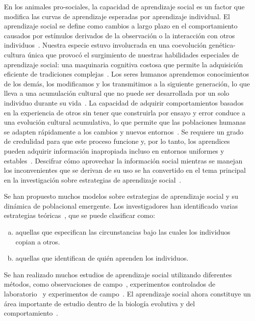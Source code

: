 \documentclass[a4paper,11pt]{book}
\theoremstyle{definition}
\begin{document}
En los animales pro-sociales, la capacidad de aprendizaje social es un factor que modifica las curvas de aprendizaje esperadas por aprendizaje individual.
%
El aprendizaje social se define como cambios a largo plazo en el comportamiento causados por est\'imulos derivados de la observaci\'on o la interacci\'on con otros individuos~\cite{hoppitt2013-socialLearningAnIntroductionBook,bandura1977-socialLearning}.
%
Nuestra especie estuvo involucrada en una coevoluci\'on gen\'etica-cultura \'unica que provoc\'o el surgimiento de nuestras habilidades especiales de aprendizaje social: una maquinaria cognitiva costosa que permite la adquisici\'on eficiente de tradiciones complejas~\cite{Richerson2010}.
%
Los seres humanos aprendemos conocimientos de los dem\'as, los modificamos y los transmitimos a la siguiente generaci\'on, lo que lleva a una acumulaci\'on cultural que no puede ser desarrollada por un solo individuo durante su vida~\cite{boyd1985-evolutionaryProcess}.
%
La capacidad de adquirir comportamientos basados en la experiencia de otros sin tener que construirla por ensayo y error conduce a una evoluci\'on cultural acumulativa, lo que permite que las poblaciones humanas se adapten r\'apidamente a los cambios y nuevos entornos~\cite{Boyd2011}.
%
Se requiere un grado de credulidad para que este proceso funcione y, por lo tanto, los aprendices pueden adquirir informaci\'on inapropiada incluso en entornos uniformes y estables~\cite{feldman1996-individualVsSocialLearningEvolutionaryAnalysis,giraldeau2002-potentialDisadvantagesSocialLearning}.
%
Descifrar c\'omo aprovechar la informaci\'on social mientras se manejan los inconvenientes que se derivan de su uso se ha convertido en el tema principal en la investigaci\'on sobre estrategias de aprendizaje social~\cite{henrich2003-evolutionOfCulturalEvolution,rendell2011-cognitiveCulture}.


Se han propuesto muchos modelos sobre estrategias de aprendizaje social y su din\'amica de poblacional emergente.
%
Los investigadores han identificado varias estrategias te\'oricas~\cite{rendell2011-cognitiveCulture,rendell2010-socialLearningTournament}, que se puede clasificar como:
\begin{enumerate}[a)]
\item aquellas que especifican las circunstancias bajo las cuales los individuos copian a otros.
\item aquellas que identifican de qui\'en aprenden los individuos.
\end{enumerate}
%
Se han realizado muchos estudios de aprendizaje social utilizando diferentes m\'etodos, como observaciones de campo~\cite{henrich2011-adaptativeLearningBiasesFiji}, experimentos controlados de laboratorio~\cite{mesoudi2011-experimentalPayoffBiasedSocialLearningUnderused,toelch2014-humanSocialInformationUse,caldwell2016-innovationLaboratoryCulturalEvolution,muthukrishna2016-whenAndWhoSocialLearning} y experimentos de campo~\cite{henrich2001-eco15Soc,efferson2007-learningCulturalTransmissionBolivia,wisdom2013-experiment,Glowacki2017}.
%
El aprendizaje social ahora constituye un \'area importante de estudio dentro de la biolog\'ia evolutiva y del comportamiento~\cite{mesoudi2016-individualAndCulturalVariationSocialLearning}.
\end{document}

